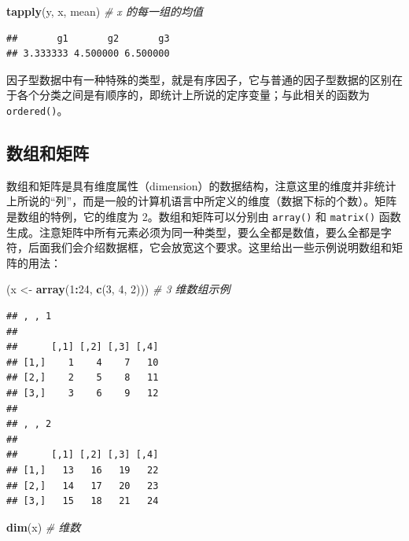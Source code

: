 \documentclass[
  b5paper,
  UTF8,twoside]{book}
\newenvironment{Shaded}{\begin{snugshade}}{\end{snugshade}}
\newcommand{\CommentTok}[1]{\textcolor[rgb]{0.56,0.35,0.01}{\textit{#1}}}
\newcommand{\DecValTok}[1]{\textcolor[rgb]{0.00,0.00,0.81}{#1}}
\newcommand{\FunctionTok}[1]{\textcolor[rgb]{0.13,0.29,0.53}{\textbf{#1}}}
\newcommand{\NormalTok}[1]{#1}
\newcommand{\OtherTok}[1]{\textcolor[rgb]{0.56,0.35,0.01}{#1}}
\newcommand{\SpecialCharTok}[1]{\textcolor[rgb]{0.81,0.36,0.00}{\textbf{#1}}}
\begin{document}
\begin{Shaded}
\begin{Highlighting}[]
\FunctionTok{tapply}\NormalTok{(y, x, mean) }\CommentTok{\# x 的每一组的均值}
\end{Highlighting}
\end{Shaded}

\begin{verbatim}
##       g1       g2       g3 
## 3.333333 4.500000 6.500000
\end{verbatim}

因子型数据中有一种特殊的类型，就是有序因子，它与普通的因子型数据的区别在于各个分类之间是有顺序的，即统计上所说的定序变量；与此相关的函数为 \texttt{ordered()}。

\subsection{数组和矩阵}\label{ux6570ux7ec4ux548cux77e9ux9635}

数组和矩阵是具有维度属性（dimension）的数据结构，注意这里的维度并非统计上所说的``列''，而是一般的计算机语言中所定义的维度（数据下标的个数）。矩阵是数组的特例，它的维度为 2。数组和矩阵可以分别由 \texttt{array()} 和 \texttt{matrix()} 函数生成。注意矩阵中所有元素必须为同一种类型，要么全都是数值，要么全都是字符，后面我们会介绍数据框，它会放宽这个要求。这里给出一些示例说明数组和矩阵的用法：

\begin{Shaded}
\begin{Highlighting}[]
\NormalTok{(x }\OtherTok{\textless{}{-}} \FunctionTok{array}\NormalTok{(}\DecValTok{1}\SpecialCharTok{:}\DecValTok{24}\NormalTok{, }\FunctionTok{c}\NormalTok{(}\DecValTok{3}\NormalTok{, }\DecValTok{4}\NormalTok{, }\DecValTok{2}\NormalTok{))) }\CommentTok{\# 3 维数组示例}
\end{Highlighting}
\end{Shaded}

\begin{verbatim}
## , , 1
## 
##      [,1] [,2] [,3] [,4]
## [1,]    1    4    7   10
## [2,]    2    5    8   11
## [3,]    3    6    9   12
## 
## , , 2
## 
##      [,1] [,2] [,3] [,4]
## [1,]   13   16   19   22
## [2,]   14   17   20   23
## [3,]   15   18   21   24
\end{verbatim}

\begin{Shaded}
\begin{Highlighting}[]
\FunctionTok{dim}\NormalTok{(x) }\CommentTok{\# 维数}
\end{Highlighting}
\end{Shaded}
\end{document}
